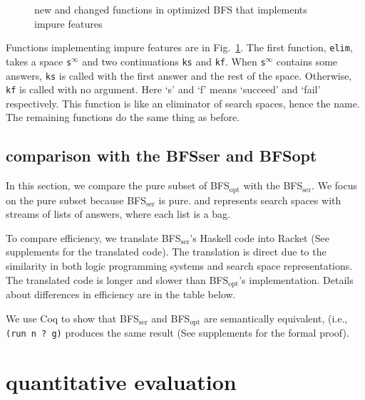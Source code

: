 \documentclass[format=acmlarge, review=true, authordraft=true]{acmart}
\newcommand{\BFSopt}[0]{BFS$_\textrm{opt}$}
\newcommand{\BFSser}[0]{BFS$_\textrm{ser}$}
\begin{document}
\begin{figure}
		
	\caption{new and changed functions in optimized BFS that implements impure 
		features}
	\label{BFS-opt-cont}
\end{figure}

Functions implementing impure features are in Fig.~\ref{BFS-opt-cont}. The 
first function, \texttt{elim}, takes a space \texttt{s$^\infty$} and two 
continuations \texttt{ks} and \texttt{kf}. When \texttt{s$^\infty$} contains 
some 
answers, \texttt{ks} is called with the first answer and the rest of the space. 
Otherwise, \texttt{kf} is called with no argument. Here `s' and `f' means 
`succeed' and `fail' respectively. This function is like an eliminator of 
search spaces, hence the name. The remaining functions do the same thing as 
before.

\subsection{comparison with the BFSser and BFSopt}

In this section, we compare the pure subset of \BFSopt{} with the 
\BFSser{}. We focus on the pure subset because \BFSser{} is pure.
and represents search spaces with streams of 
lists of answers, where each list is a bag.

To compare efficiency, we translate \BFSser{}'s Haskell code into Racket (See supplements for the translated code). The translation is direct 
due to the similarity in both logic programming systems and search space 
representations. The translated code is longer and slower than \BFSopt{}'s implementation. Details about 
differences in efficiency are in the table below.

We use Coq to show that \BFSser{} and \BFSopt{} are 
semantically equivalent, (i.e., \texttt{(run n ? g)} 
produces the same result (See supplements for the formal proof).

\section{quantitative evaluation}
\end{document}
